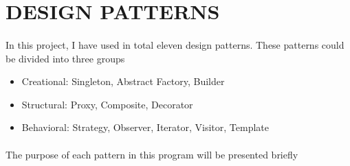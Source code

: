 \section{DESIGN PATTERNS}

\paragraph{}
In this project, I have used in total eleven design patterns. These patterns could be divided into three groups

\begin{itemize}
\item Creational: Singleton, Abstract Factory, Builder
\item Structural: Proxy, Composite, Decorator
\item Behavioral: Strategy, Observer, Iterator, Visitor, Template
\end{itemize}

\paragraph{}
The purpose of each pattern in this program will be presented briefly

\begin{itemize}

\end{itemize}
